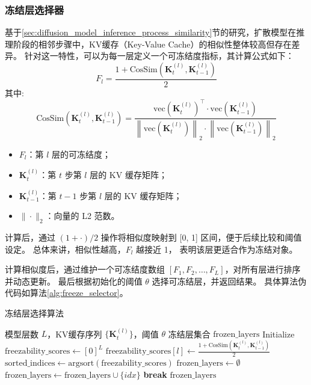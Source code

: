 \subsubsection{冻结层选择器}
\par
基于\ref{sec:diffusion_model_inference_process_similarity}节的研究，扩散模型在推理阶段的相邻步骤中，KV缓存（Key-Value Cache）的相似性整体较高但存在差异。
针对这一特性，可以为每一层定义一个可冻结度指标，其计算公式如下：
\begin{equation}
    F_l = \frac{1 + \text{CosSim}(\mathbf{K}_t^{(l)}, \mathbf{K}_{t-1}^{(l)})}{2}
\end{equation}
其中:
\begin{equation}
    \text{CosSim}(\mathbf{K}_t^{(l)}, \mathbf{K}_{t-1}^{(l)}) = 
    \frac{
        \text{vec}(\mathbf{K}_t^{(l)})^\top \cdot \text{vec}(\mathbf{K}_{t-1}^{(l)})
    }{
        \left\|\text{vec}(\mathbf{K}_t^{(l)})\right\|_2 \cdot \left\|\text{vec}(\mathbf{K}_{t-1}^{(l)})\right\|_2
    }
\end{equation}
\par
\begin{itemize}
    \item $F_l$：第 $l$ 层的可冻结度；
    \item $\mathbf{K}_t^{(l)}$：第 $t$ 步第 $l$ 层的 KV 缓存矩阵；
    \item $\mathbf{K}_{t-1}^{(l)}$：第 $t - 1$ 步第 $l$ 层的 KV 缓存矩阵；
    \item $\|\cdot\|_2$：向量的 L2 范数。
\end{itemize}
\par
计算后，通过 $(1 + \cdot)/2$ 操作将相似度映射到 [0, 1] 区间，便于后续比较和阈值设定。
总体来讲，相似性越高，$F_l$ 越接近 1，
表明该层更适合作为冻结对象。
\par
计算相似度后，通过维护一个可冻结度数组 $[F_1, F_2, \dots, F_L]$，对所有层进行排序并动态更新。
最后根据初始化的阈值 $\theta$ 选择可冻结层，并返回结果。
具体算法伪代码如算法\ref{alg:freeze_selector}。
\begin{algorithm}[!h]
    \caption{冻结层选择算法}
    \label{alg:freeze_selector}
    \renewcommand{\algorithmicrequire}{\textbf{Input:}}
    \renewcommand{\algorithmicensure}{\textbf{Output:}}
    \begin{algorithmic}[1]
        \REQUIRE 模型层数 $L$，KV缓存序列 $\{\mathbf{K}_t^{(l)}\}$，阈值 $\theta$
        \ENSURE 冻结层集合 $\text{frozen\_layers}$
        \STATE Initialize $\text{freezability\_scores} \leftarrow [0]^L$
            \STATE $\text{freezability\_scores}[l] \leftarrow \frac{1 + \text{CosSim}(\mathbf{K}_t^{(l)}, \mathbf{K}_{t-1}^{(l)})}{2}$
        \ENDFOR
        \STATE $\text{sorted\_indices} \leftarrow \text{argsort}(\text{freezability\_scores})$ 
        \STATE $\text{frozen\_layers} \leftarrow \emptyset$
                \STATE $\text{frozen\_layers} \leftarrow \text{frozen\_layers} \cup \{idx\}$
                \STATE \textbf{break}
            \ENDIF
        \ENDFOR
        \RETURN $\text{frozen\_layers}$
    \end{algorithmic}
\end{algorithm}
